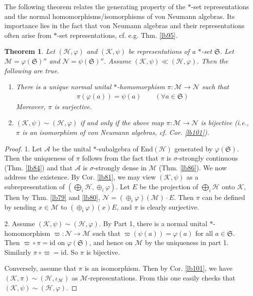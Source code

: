 \documentclass[12pt,b5paper,notitlepage]{article}
\theoremstyle{definition}
\theoremstyle{plain}
\newtheorem{thm}[df]{Theorem}
\newcommand{\fk}{\mathfrak}
\newcommand{\mc}{\mathcal}
\newcommand{\End}{\mathrm{End}} %
\newcommand{\id}{\mathrm{id}}
\numberwithin{equation}{section}
\begin{document}
The following theorem relates the generating property of the $*$-set representations and the normal homomorphisms/isomorphisms of von Neumann algebras. Its importance lies in the fact that von Neumann algebras and their representations often arise from $*$-set representations, cf. e.g. Thm. \ref{lb95}.






\begin{thm}\label{lb94}
Let $(\mc H,\varphi)$ and $(\mc K,\psi)$ be representations of a $*$-set $\fk S$. Let $\mc M=\varphi(\fk S)''$ and $\mc N=\psi(\fk S)''$. Assume $(\mc K,\psi)\ll(\mc H,\varphi)$. Then the following are true.
\begin{enumerate}
\item There is a unique normal unital $*$-homomorphism $\pi:\mc M\rightarrow\mc N$ such that
\begin{align}
\pi(\varphi(a))=\psi(a)\qquad(\forall a\in\fk S)
\end{align}
Moreover, $\pi$ is surjective.
\item $(\mc K,\psi)\sim(\mc H,\varphi)$ if and only if the above map $\pi:\mc M\rightarrow\mc N$ is bijective (i.e., $\pi$ is an isomorphism of von Neumann algebras, cf. Cor. \ref{lb101}).
\end{enumerate}
\end{thm}



\begin{proof}
1. Let $\mc A$ be the unital $*$-subalgebra of $\End(\mc H)$ generated by $\varphi(\fk S)$. Then the uniqueness of $\pi$ follows from the fact that $\pi$ is $\sigma$-strongly continuous (Thm. \ref{lb84}) and that $\mc A$ is $\sigma$-strongly dense in $\mc M$ (Thm. \ref{lb86}). We now address the existence. By Cor. \ref{lb81}, we may view $(\mc K,\psi)$ as a subrepresentation of $(\bigoplus_i\mc H,\oplus_i\varphi)$. Let $E$ be the projection of $\bigoplus_i\mc H$ onto $\mc K$, Then by Thm. \ref{lb79} and \ref{lb80}, $\mc N=(\oplus_i\varphi)(\mc M)\cdot E$. Then $\pi$ can be defined by sending $x\in\mc M$ to $(\oplus_i\varphi)(x)E$, and $\pi$ is clearly surjective.

2. Assume $(\mc K,\psi)\sim(\mc H,\varphi)$. By Part 1, there is a normal unital $*$-homomorphism $\varpi:\mc N\rightarrow\mc M$ such that $\varpi(\psi(a))=\varphi(a)$ for all $a\in\fk S$. Then $\varpi\circ\pi=\id$ on $\varphi(\fk S)$, and hence on $\mc M$ by the uniqueness in part 1. Similarly $\pi\circ\varpi=\id$. So $\pi$ is bijective.

Conversely, assume that $\pi$ is an isomorphism. Then by Cor. \ref{lb101}, we have $(\mc K,\pi)\sim(\mc H,\iota_{\mc M})$ as $\mc M$-representations. From this one easily checks that $(\mc K,\psi)\sim(\mc H,\varphi)$.
\end{proof}
\end{document}

